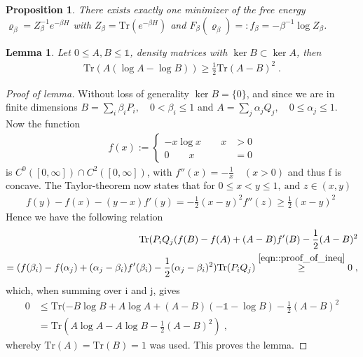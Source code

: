 \documentclass[
a4paper, %
11pt, %
onecolumn, %
openany, %
]{memoir}
\theoremstyle{definition}
\theoremstyle{remark}
\theoremstyle{plain}
\newtheorem{prop}{Proposition}[chapter]
\newtheorem{lemma}{Lemma}[chapter]
\begin{document}
\begin{prop}
	There exists exactly one minimizer of the free energy $\varrho_{\beta}=Z_{\beta}^{-1}e^{-\beta H}$ with $Z_{\beta}=\mathrm{Tr}(e^{-\beta H})$ and $F_{\beta}(\varrho_{\beta})=:f_{\beta}=-\beta^{-1}\log Z_{\beta}$.
\end{prop}
\begin{lemma}
	Let $0\leq A,B\leq \mathds{1}$, density matrices with $\ker B\subset \ker A$, then \begin{align}
	\mathrm{Tr}(A(\log A-\log B))\geq \frac{1}{2}\mathrm{Tr}(A-B)^2\; .
	\end{align}
\end{lemma}
\begin{proof}[Proof of lemma]
	Without loss of generality $\ker B=\{0\}$, and since we are in finite dimensions $B=\sum_i\beta_iP_i,\quad 0<\beta_i\leq 1$ and $A=\sum_j \alpha_jQ_j, \quad 0\leq \alpha_j\leq 1$. Now the function \begin{align}
	f(x):=\begin{cases}
	-x\log x\qquad  x&>0\\0 \qquad x&=0
	\end{cases}
	\end{align}
	is $C^0([0,\infty])\cap C^2([0,\infty])$, with $f''(x)=-\frac{1}{x}\quad (x>0)$ and thus f is concave. The Taylor-theorem now states that for $0\leq x<y\leq 1,~ \text{and }z\in (x,y)$
	\begin{align}
	f(y)-f(x)-(y-x)f'(y)=-\frac{1}{2}(x-y)^2f''(z)\geq \frac{1}{2}(x-y)^2\;\label{eqn::proof_of_ineq}
	\end{align}
	Hence we have the following relation \begin{align}
	\mathrm{Tr}(P_iQ_j(f(B)-f(A)+(A-B)f'(B)-\frac{1}{2}(A-B)^2\\=(f(\beta_i)-f(\alpha_j)+(\alpha_j-\beta_i)f'(\beta_i)-\frac{1}{2}(\alpha_j-\beta_i)^2)\mathrm{Tr}(P_iQ_j)\overset{\eqref{eqn::proof_of_ineq}}{\geq }0\; ,
	\end{align}
	which, when summing over i and j, gives \begin{align}
	0&\leq \mathrm{Tr}(-B\log B+A\log A +(A-B)(-\mathds{1}-\log B)-\frac{1}{2}(A-B)^2\\
	&=\mathrm{Tr}(A\log A-A\log B-\frac{1}{2}(A-B)^2)\;,
	\end{align}
	whereby $\mathrm{Tr}(A)=\mathrm{Tr}(B)=1$ was used. This proves the lemma.
\end{proof}
\end{document}
